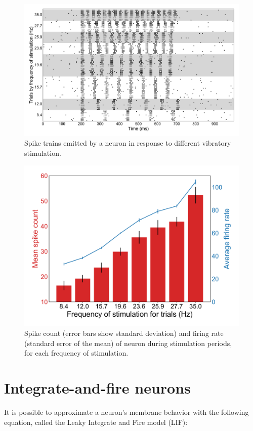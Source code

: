 \documentclass{article}
\begin{document}
\begin{figure}[H]
\centering
\includegraphics[width=1.1\linewidth]{report3_fig7.png}
\caption[spt]{Spike trains emitted by a neuron in response to different vibratory stimulation.}\label{fig:fig5}
\end{figure}

\begin{figure}[H]
\centering
\includegraphics[width=.8\linewidth]{report3_fig8.png}
\caption[spt]{Spike count (error bars show standard deviation) and firing rate (standard error of the mean) of neuron during stimulation periods, for each frequency of stimulation. }\label{fig:fig6}
\end{figure}



\section{Integrate-and-fire neurons}\label{int}
It is possible to approximate a neuron's membrane behavior with the following equation,  called the Leaky Integrate and Fire model (LIF):
\end{document}
